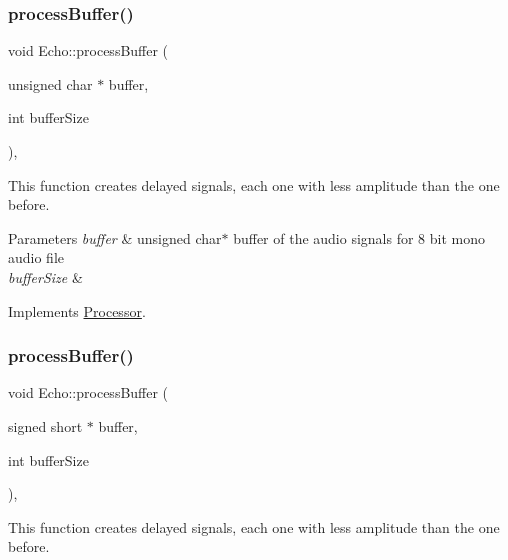 \subsubsection{\texorpdfstring{process\+Buffer()}{processBuffer()}\hspace{0.1cm}{\footnotesize\ttfamily [1/2]}}
{\footnotesize\ttfamily void Echo\+::process\+Buffer (\begin{DoxyParamCaption}\item[{unsigned char $\ast$}]{buffer,  }\item[{int}]{buffer\+Size }\end{DoxyParamCaption})\hspace{0.3cm}{\ttfamily [override]}, {\ttfamily [virtual]}}



This function creates delayed signals, each one with less amplitude than the one before. 


\begin{DoxyParams}{Parameters}
{\em buffer} & unsigned char$\ast$ buffer of the audio signals for 8 bit mono audio file \\
\hline
{\em buffer\+Size} & \\
\hline
\end{DoxyParams}


Implements \hyperlink{classProcessor}{Processor}.

\mbox{\label{classEcho_a3c62f947fd0f9ef063269ed2ca4fab8e}} 
\subsubsection{\texorpdfstring{process\+Buffer()}{processBuffer()}\hspace{0.1cm}{\footnotesize\ttfamily [2/2]}}
{\footnotesize\ttfamily void Echo\+::process\+Buffer (\begin{DoxyParamCaption}\item[{signed short $\ast$}]{buffer,  }\item[{int}]{buffer\+Size }\end{DoxyParamCaption})\hspace{0.3cm}{\ttfamily [override]}, {\ttfamily [virtual]}}



This function creates delayed signals, each one with less amplitude than the one before. 



